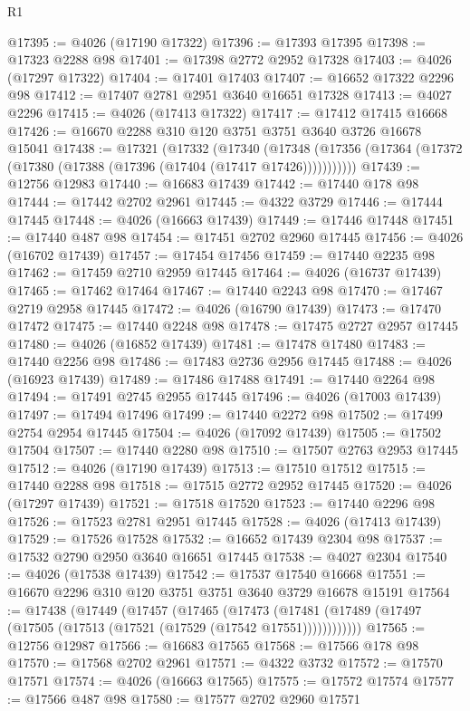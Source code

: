\begin{lexlean}{R1}
\begin{coremodule}
@17395 := @4026 (@17190 @17322)
@17396 := @17393 @17395
@17398 := @17323 @2288 @98
@17401 := @17398 @2772 @2952 @17328
@17403 := @4026 (@17297 @17322)
@17404 := @17401 @17403
@17407 := @16652 @17322 @2296 @98
@17412 := @17407 @2781 @2951 @3640 @16651 @17328
@17413 := @4027 @2296
@17415 := @4026 (@17413 @17322)
@17417 := @17412 @17415 @16668
@17426 := @16670 @2288 @310 @120 @3751 @3751 @3640 @3726 @16678 @15041
@17438 := @17321
    (@17332
      (@17340
        (@17348 (@17356 (@17364 (@17372 (@17380 (@17388 (@17396 (@17404 (@17417 @17426)))))))))))
@17439 := @12756 @12983
@17440 := @16683 @17439
@17442 := @17440 @178 @98
@17444 := @17442 @2702 @2961
@17445 := @4322 @3729
@17446 := @17444 @17445
@17448 := @4026 (@16663 @17439)
@17449 := @17446 @17448
@17451 := @17440 @487 @98
@17454 := @17451 @2702 @2960 @17445
@17456 := @4026 (@16702 @17439)
@17457 := @17454 @17456
@17459 := @17440 @2235 @98
@17462 := @17459 @2710 @2959 @17445
@17464 := @4026 (@16737 @17439)
@17465 := @17462 @17464
@17467 := @17440 @2243 @98
@17470 := @17467 @2719 @2958 @17445
@17472 := @4026 (@16790 @17439)
@17473 := @17470 @17472
@17475 := @17440 @2248 @98
@17478 := @17475 @2727 @2957 @17445
@17480 := @4026 (@16852 @17439)
@17481 := @17478 @17480
@17483 := @17440 @2256 @98
@17486 := @17483 @2736 @2956 @17445
@17488 := @4026 (@16923 @17439)
@17489 := @17486 @17488
@17491 := @17440 @2264 @98
@17494 := @17491 @2745 @2955 @17445
@17496 := @4026 (@17003 @17439)
@17497 := @17494 @17496
@17499 := @17440 @2272 @98
@17502 := @17499 @2754 @2954 @17445
@17504 := @4026 (@17092 @17439)
@17505 := @17502 @17504
@17507 := @17440 @2280 @98
@17510 := @17507 @2763 @2953 @17445
@17512 := @4026 (@17190 @17439)
@17513 := @17510 @17512
@17515 := @17440 @2288 @98
@17518 := @17515 @2772 @2952 @17445
@17520 := @4026 (@17297 @17439)
@17521 := @17518 @17520
@17523 := @17440 @2296 @98
@17526 := @17523 @2781 @2951 @17445
@17528 := @4026 (@17413 @17439)
@17529 := @17526 @17528
@17532 := @16652 @17439 @2304 @98
@17537 := @17532 @2790 @2950 @3640 @16651 @17445
@17538 := @4027 @2304
@17540 := @4026 (@17538 @17439)
@17542 := @17537 @17540 @16668
@17551 := @16670 @2296 @310 @120 @3751 @3751 @3640 @3729 @16678 @15191
@17564 := @17438
    (@17449
      (@17457
        (@17465
          (@17473 (@17481 (@17489 (@17497 (@17505 (@17513 (@17521 (@17529 (@17542 @17551))))))))))))
@17565 := @12756 @12987
@17566 := @16683 @17565
@17568 := @17566 @178 @98
@17570 := @17568 @2702 @2961
@17571 := @4322 @3732
@17572 := @17570 @17571
@17574 := @4026 (@16663 @17565)
@17575 := @17572 @17574
@17577 := @17566 @487 @98
@17580 := @17577 @2702 @2960 @17571

\end{coremodule}
\end{lexlean}
